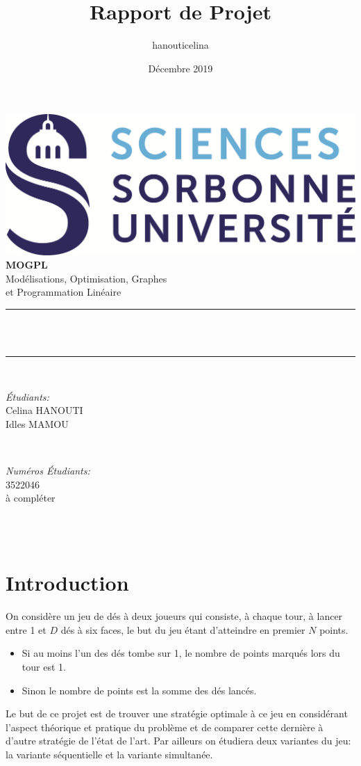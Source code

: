 \documentclass[12pt]{article}
\title{Rapport de Projet}
\author{hanouticelina}
\date{Décembre 2019}
\makeatletter
\let\thetitle\@title
\let\thedate\@date
\makeatother
\begin{document}
\begin{titlepage}
	\centering
    \vspace{0.7cm}
    \includegraphics[scale = 0.4]{sorbonne.png}\\[2cm]
    \textbf{\LARGE MOGPL}\\[0.4 cm]
    \Large{Modélisations, Optimisation, Graphes\\et Programmation Linéaire}\\[1 cm]
	\rule{\linewidth}{0.2 mm} \\[0.4 cm]
	{\Huge{\bfseries \thetitle}}\\
	\rule{\linewidth}{0.2 mm} \\[1.5 cm]
	
	\begin{minipage}{0.4\textwidth}
		\begin{flushleft} \large
			\emph{Étudiants:}\\
			Celina HANOUTI\\
			Idles MAMOU
			\end{flushleft}
			\end{minipage}~
			\begin{minipage}{0.4\textwidth}
			\begin{flushright} \large
			\emph{Numéros Étudiants:} \\
			3522046\\
			à compléter
		\end{flushright}
	\end{minipage}\\[4 cm]
	{\large \thedate}\\[3 cm]
	\vfill
\end{titlepage}
\tableofcontents
\newpage

\section{Introduction}
On considère un jeu de dés à deux joueurs qui consiste, à chaque tour, à lancer entre 1 et $D$ dés à six faces, le but du jeu étant d'atteindre en premier $N$ points.
\begin{itemize}
  \item Si au moins l'un des dés tombe sur 1, le nombre de points marqués lors du tour est 1.
  \item Sinon le nombre de points est la somme des dés lancés.
\end{itemize}
Le but de ce projet est de trouver une stratégie optimale à ce jeu en considérant l'aspect théorique et pratique du problème et de comparer cette dernière à d'autre stratégie de l'état de l'art.
Par ailleurs on étudiera deux variantes du jeu: la variante séquentielle et la variante simultanée.
\end{document}
